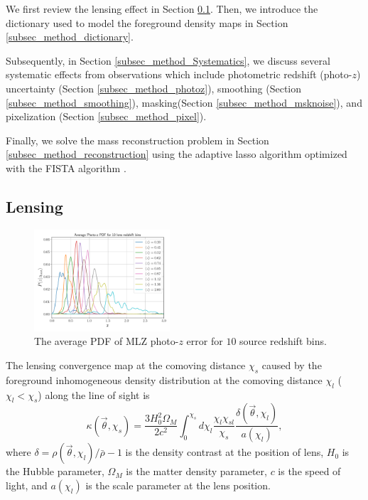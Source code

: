 \documentclass[twocolumn]{aastex63}
\begin{document}
We first review the lensing effect in Section \ref{subsec_method_delta2shear}.
Then, we introduce the dictionary used to model the foreground density maps in
Section \ref{subsec_method_dictionary}.

Subsequently, in Section \ref{subsec_method_Systematics}, we discuss several
systematic effects from observations which include photometric redshift
(photo-$z$) uncertainty (Section \ref{subsec_method_photoz}), smoothing
(Section \ref{subsec_method_smoothing}), masking(Section
\ref{subsec_method_msknoise}), and pixelization (Section
\ref{subsec_method_pixel}).

Finally, we solve the mass reconstruction problem in Section
\ref{subsec_method_reconstruction} using the adaptive lasso algorithm
\citep{AdaLASSO-Zou2006} optimized with the FISTA algorithm
\citep{FISTA-Beck2009}.


\subsection{Lensing}
\label{subsec_method_delta2shear}

\begin{figure}
 \centering
 \includegraphics[width=0.45\textwidth]{mlz-poz.pdf}
 \caption{The average PDF of MLZ photo-$z$ error for $10$ source redshift bins.
        }\label{fig_pdfpz}
\end{figure}

The lensing convergence map at the comoving distance $\chi_s$ caused by the
foreground inhomogeneous density distribution at the comoving distance $\chi_l$
($\chi_l< \chi_s$) along the line of sight is
\begin{equation}
\kappa(\vec{\theta},\chi_s)=\frac{3H_0^2\Omega_M}{2 c^2} \int_0^{\chi_s} d\chi_l \frac{\chi_l \chi_{sl}}{\chi_s}
\frac{\delta(\vec{\theta},\chi_l)}{a(\chi_l)},
\end{equation}
where $\delta=\rho(\vec{\theta},\chi_l)/\bar{\rho}-1$ is the density contrast
at the position of lens, $H_0$ is the Hubble parameter, $\Omega_M$ is the
matter density parameter, $c$ is the speed of light, and $a(\chi_l)$ is the
scale parameter at the lens position.
\end{document}
